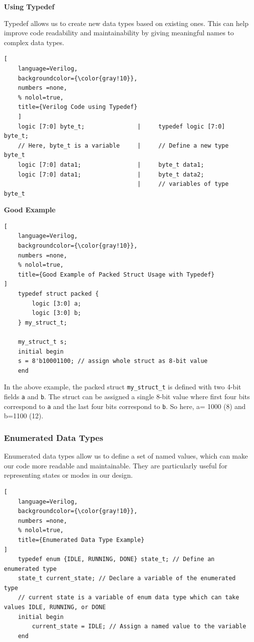 \documentclass[12pt, a4paper]{article}
\begin{document}
\vspace{1em}

\textbf{Using Typedef}

Typedef allows us to create new data types based on existing ones. This can help improve code readability and maintainability by giving meaningful names to complex data types.


\begin{lstlisting}[
    language=Verilog,
    backgroundcolor={\color{gray!10}},
    numbers =none,
    % nolol=true,
    title={Verilog Code using Typedef}
    ]
    logic [7:0] byte_t;               |     typedef logic [7:0] byte_t;  
    // Here, byte_t is a variable     |     // Define a new type byte_t
    logic [7:0] data1;                |     byte_t data1;     
    logic [7:0] data1;                |     byte_t data2;   
                                      |     // variables of type byte_t
\end{lstlisting}


\textbf{Good Example}

\begin{lstlisting}[
    language=Verilog,
    backgroundcolor={\color{gray!10}},
    numbers =none,
    % nolol=true,
    title={Good Example of Packed Struct Usage with Typedef}
]
    typedef struct packed {
        logic [3:0] a;
        logic [3:0] b;
    } my_struct_t;

    my_struct_t s;
    initial begin
    s = 8'b10001100; // assign whole struct as 8-bit value
    end
\end{lstlisting}

In the above example, the packed struct \texttt{my\_struct\_t} is defined with two 4-bit fields \texttt{a} and \texttt{b}. The struct can be assigned a single 8-bit value where first four bits correspond to \texttt{a} and the last four bits correspond to \texttt{b}. So here, a= 1000 (8) and b=1100 (12).

\vspace{1em}

\subsubsection{Enumerated Data Types}

Enumerated data types allow us to define a set of named values, which can make our code more readable and maintainable. They are particularly useful for representing states or modes in our design.

\begin{lstlisting}[
    language=Verilog,
    backgroundcolor={\color{gray!10}},
    numbers =none,
    % nolol=true,
    title={Enumerated Data Type Example}
]
    typedef enum {IDLE, RUNNING, DONE} state_t; // Define an enumerated type
    state_t current_state; // Declare a variable of the enumerated type
    // current state is a variable of enum data type which can take values IDLE, RUNNING, or DONE
    initial begin
        current_state = IDLE; // Assign a named value to the variable
    end
\end{lstlisting}
\end{document}
